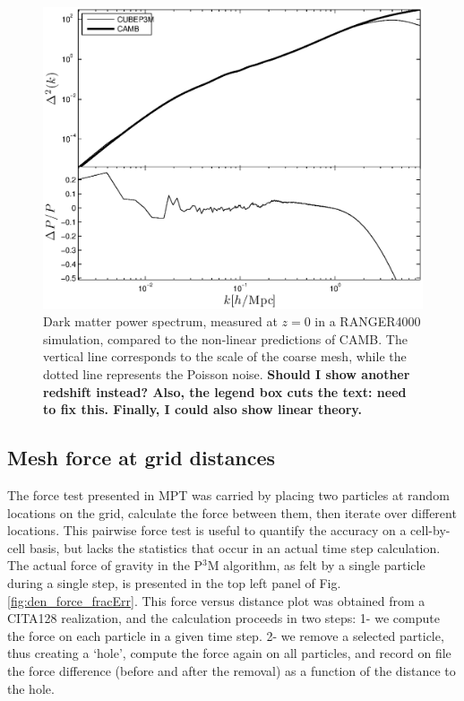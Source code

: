 \begin{figure}%
  \begin{center}
    \includegraphics[width=5.2in]{graphs/power_highres.eps}
  \caption{Dark matter power spectrum, measured at $z=0$ in a RANGER4000 simulation,
  compared to the non-linear predictions of {\small CAMB}. 
  The vertical line corresponds to the scale of the coarse mesh, while the dotted line represents the Poisson noise.
    \label{fig:power_highres} {\bf Should I show another redshift instead? Also, the legend box cuts the text: need to fix this. Finally, I could also show linear theory.}}
\end{center}
\end{figure}

\subsection{Mesh force at grid distances}
\label{subsec:force}

The force test presented in MPT was carried by placing two particles at random locations on the grid, calculate the force between them, then iterate
over different locations. This pairwise force test is useful to quantify the accuracy on a cell-by-cell basis, but lacks the statistics that occur in an actual time step calculation.  
The actual force of gravity in the P$^3$M algorithm,
as felt by a single particle during a single step, is presented in the top left panel of Fig. \ref{fig:den_force_fracErr}.
This force versus distance plot was obtained from a CITA128 realization, and the calculation proceeds in two steps: 
1- we compute the force on each particle in a given time step.
2- we remove a selected particle, thus creating a `hole', compute the force again on all particles, and record on file the 
force difference (before  and after the removal) as a function of the distance to the hole.

